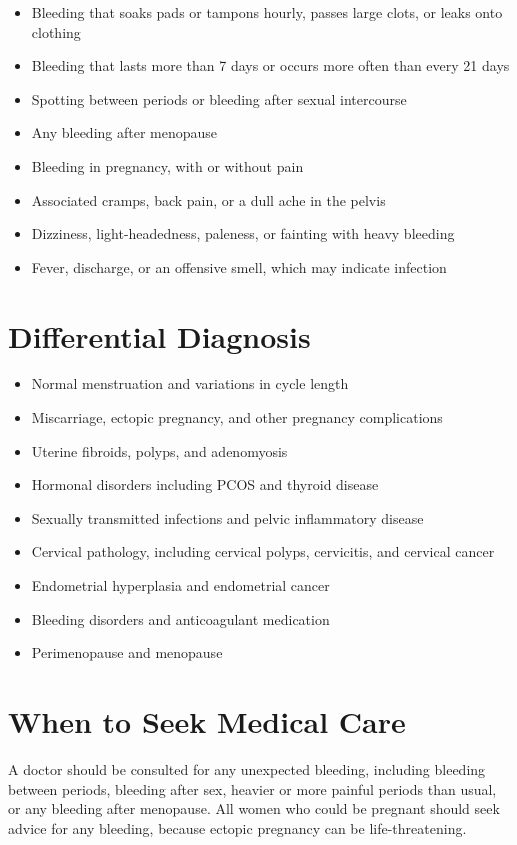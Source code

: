 \begin{itemize}
    \item Bleeding that soaks pads or tampons hourly, passes large clots, or leaks onto clothing
    \item Bleeding that lasts more than 7 days or occurs more often than every 21 days
    \item Spotting between periods or bleeding after sexual intercourse
    \item Any bleeding after menopause
    \item Bleeding in pregnancy, with or without pain
    \item Associated cramps, back pain, or a dull ache in the pelvis
    \item Dizziness, light-headedness, paleness, or fainting with heavy bleeding
    \item Fever, discharge, or an offensive smell, which may indicate infection
\end{itemize}

\section*{Differential Diagnosis}
\begin{itemize}
    \item Normal menstruation and variations in cycle length
    \item Miscarriage, ectopic pregnancy, and other pregnancy complications
    \item Uterine fibroids, polyps, and adenomyosis
    \item Hormonal disorders including PCOS and thyroid disease
    \item Sexually transmitted infections and pelvic inflammatory disease
    \item Cervical pathology, including cervical polyps, cervicitis, and cervical cancer
    \item Endometrial hyperplasia and endometrial cancer
    \item Bleeding disorders and anticoagulant medication
    \item Perimenopause and menopause
\end{itemize}

\section*{When to Seek Medical Care}
A doctor should be consulted for any unexpected bleeding, including bleeding between periods, bleeding after sex, heavier or more painful periods than usual, or any bleeding after menopause. All women who could be pregnant should seek advice for any bleeding, because ectopic pregnancy can be life-threatening.

